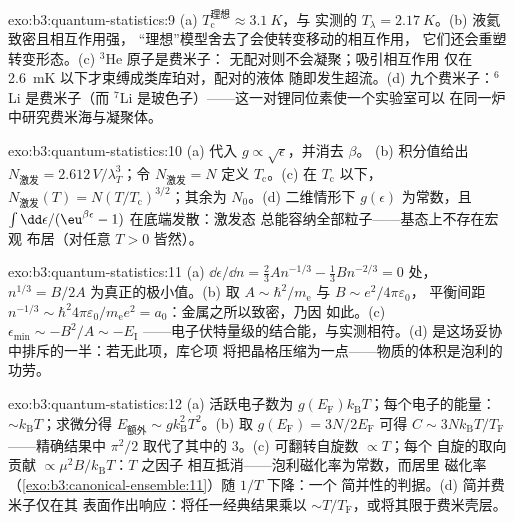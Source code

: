 \begin{solution}{exo:b3:quantum-statistics:9}
(a) $T_{\text{c}}^{\text{理想}} \approx \qty{3.1}{K}$，与
实测的 $T_\lambda = \qty{2.17}{K}$。(b) 液氦致密且相互作用强，
“理想”模型舍去了会使转变移动的相互作用，
它们还会重塑转变形态。(c) $^3$He 原子是费米子：
无配对则不会凝聚；吸引相互作用
仅在 \qty{2.6}{mK} 以下才束缚成类库珀对，配对的液体
随即发生超流。(d) 九个费米子：$^6$Li 是费米子（而
$^7$Li 是玻色子）——这一对锂同位素使一个实验室可以
在同一炉中研究费米海与凝聚体。
\end{solution}

\begin{solution}{exo:b3:quantum-statistics:10}
(a) 代入 $g \propto \sqrt\epsilon$，并消去 $\beta$。
(b) 积分值给出 $N_{\text{激发}} =
2.612\,V/\lambda_T^3$；令 $N_{\text{激发}} = N$ 定义
$T_{\text{c}}$。(c) 在 $T_{\text{c}}$ 以下，$N_{\text{激发}}(T) =
N(T/T_{\text{c}})^{3/2}$；其余为 $N_0$。(d) 二维情形下
$g(\epsilon)$ 为常数，且 $\int\dd\epsilon/(\eu^{
\beta\epsilon} - 1)$ 在底端发散：激发态
总能容纳全部粒子——基态上不存在宏观
布居（对任意 $T > 0$ 皆然）。
\end{solution}

\begin{solution}{exo:b3:quantum-statistics:11}
(a) $\dd\epsilon/\dd n = \tfrac23 An^{-1/3} - \tfrac13 Bn^{-2/3} =
0$ 处，$n^{1/3} = B/2A$ 为真正的极小值。(b) 取 $A \sim
\hbar^2/m_{\text{e}}$ 与 $B \sim e^2/4\pi\varepsilon_0$，
平衡间距 $n^{-1/3} \sim \hbar^2 4\pi\varepsilon_0/
m_{\text{e}}e^2 = a_0$：金属之所以致密，乃因
如此。(c) $\epsilon_{\min} \sim -B^2/A \sim -E_{\text{I}}$
——电子伏特量级的结合能，与实测相符。(d) 
是这场妥协中排斥的一半：若无此项，库仑项
将把晶格压缩为一点——物质的体积是泡利的功劳。
\end{solution}

\begin{solution}{exo:b3:quantum-statistics:12}
(a) 活跃电子数为 $g(E_{\text{F}})k_{\text{B}}T$；每个电子的能量：
$\sim k_{\text{B}}T$；求微分得 $E_{\text{额外}} \sim
g k_{\text{B}}^2T^2$。(b) 取 $g(E_{\text{F}}) = 3N/2E_{\text{F}}$
可得 $C \sim 3Nk_{\text{B}}T/T_{\text{F}}$——精确结果中
$\pi^2/2$ 取代了其中的 3。(c) 可翻转自旋数 $\propto T$；每个
自旋的取向贡献 $\propto \mu^2B/k_{\text{B}}T$：$T$ 之因子
相互抵消——泡利磁化率为常数，而居里
磁化率（\cref{exo:b3:canonical-ensemble:11}）随 $1/T$ 下降：一个
简并性的判据。(d) 简并费米子仅在其
表面作出响应：将任一经典结果乘以 $\sim
T/T_{\text{F}}$，或将其限于费米壳层。
\end{solution}

